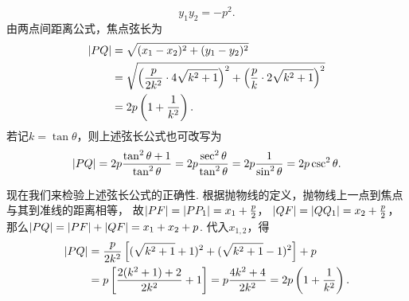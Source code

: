 \begin{enumerate}
\begin{enumerate}
\begin{equation}
			y_1 y_2 = -p^2.
		\end{equation}
		由两点间距离公式，焦点弦长为\begin{align}
			\abs{PQ}
			&= \sqrt{(x_1-x_2)^2+(y_1-y_2)^2}
				\notag \\
			&= \sqrt{
				\left(\frac{p}{2 k^2} \cdot 4 \sqrt{k^2+1}\right)^2
				+ \left(\frac{p}{k} \cdot 2 \sqrt{k^2+1}\right)^2
			}
				\notag \\
			&= 2p \left(1+\frac{1}{k^2}\right).
		\end{align}
		若记\(k=\tan\theta\)，则上述弦长公式也可改写为\begin{equation}
			\abs{PQ}
			= 2p \frac{\tan^2\theta+1}{\tan^2\theta}
			= 2p \frac{\sec^2\theta}{\tan^2\theta}
			= 2p \frac{1}{\sin^2\theta}
			= 2p \csc^2\theta.
		\end{equation}

		现在我们来检验上述弦长公式的正确性.
		根据抛物线的定义，抛物线上一点到焦点与其到准线的距离相等，
		故\(\abs{PF} = \abs{P P_1} = x_1 + \frac{p}{2}\)，
		\(\abs{QF} = \abs{Q Q_1} = x_2 + \frac{p}{2}\)，
		那么\(\abs{PQ} = \abs{PF}+\abs{QF} = x_1 + x_2 + p\).
		代入\(x_{1,2}\)，得\begin{align*}
			\abs{PQ}
			&= \frac{p}{2 k^2}
				\left[
					(\sqrt{k^2+1} + 1)^2
					+ (\sqrt{k^2+1} - 1)^2
				\right] + p \\
			&= p\left[\frac{2(k^2 + 1) + 2}{2 k^2} + 1\right]
			= p \frac{4k^2 + 4}{2k^2}
			= 2p \left(1+\frac{1}{k^2}\right).
		\end{align*}
	\end{enumerate}


\end{enumerate}
